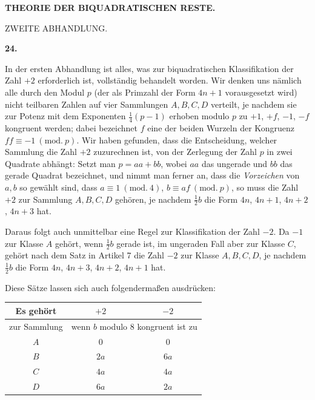 \clearpage
{}%

\renewcommand{\BookRunningTitle}{Theorie der biquadratischen Reste}
\renewcommand{\Article}[1]{\par\medskip\Needspace{4\baselineskip}\pdfbookmark[1]{Artikel #1}{paper-five-art-#1}\centerline{\textbf{#1.}}\nobreak\smallskip}
\begin{center}
\textbf{THEORIE DER BIQUADRATISCHEN RESTE.}\par
\bigskip ZWEITE ABHANDLUNG.
\end{center}
\Article{24}
In der ersten Abhandlung ist alles, was zur biquadratischen Klassifikation der Zahl $+2$ erforderlich ist, vollständig behandelt worden. Wir denken uns nämlich alle durch den Modul $p$ (der als Primzahl der Form $4n+1$ vorausgesetzt wird) nicht teilbaren Zahlen auf vier Sammlungen $A,B,C,D$ verteilt, je nachdem sie zur Potenz mit dem Exponenten $\frac14(p-1)$ erhoben modulo $p$ zu $+1$, $+f$, $-1$, $-f$ kongruent werden; dabei bezeichnet $f$ eine der beiden Wurzeln der Kongruenz $ff\equiv-1\ (\mathrm{mod.}\ p)$. Wir haben gefunden, dass die Entscheidung, welcher Sammlung die Zahl $+2$ zuzurechnen ist, von der Zerlegung der Zahl $p$ in zwei Quadrate abhängt: Setzt man $p=aa+bb$, wobei $aa$ das ungerade und $bb$ das gerade Quadrat bezeichnet, und nimmt man ferner an, dass die \emph{Vorzeichen} von $a,b$ so gewählt sind, dass $a\equiv1\ (\mathrm{mod.}\ 4)$, $b\equiv af\ (\mathrm{mod.}\ p)$, so muss die Zahl $+2$ zur Sammlung $A,B,C,D$ gehören, je nachdem $\frac12b$ die Form $4n$, $4n+1$, $4n+2$, $4n+3$ hat.

Daraus folgt auch unmittelbar eine Regel zur Klassifikation der Zahl $-2$. Da $-1$ zur Klasse $A$ gehört, wenn $\frac12b$ gerade ist, im ungeraden Fall aber zur Klasse $C$, gehört nach dem Satz in Artikel 7 die Zahl $-2$ zur Klasse $A,B,C,D$, je nachdem $\frac12b$ die Form $4n$, $4n+3$, $4n+2$, $4n+1$ hat.

Diese Sätze lassen sich auch folgendermaßen ausdrücken:

%
\begin{center}
\begin{tabular}{c|c|c}
Es gehört&$+2$&$-2$\\\hline
zur Sammlung&\multicolumn{2}{c}{wenn $b$ modulo $8$ kongruent ist zu}\\\hline
$A$&$0$&$0$\\
$B$&$2a$&$6a$\\
$C$&$4a$&$4a$\\
$D$&$6a$&$2a$
\end{tabular}
\end{center}

